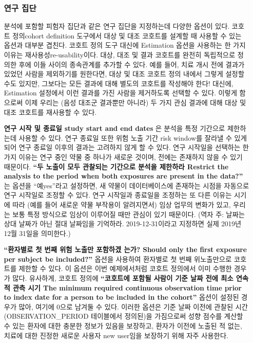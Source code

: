 \documentclass[10.5pt]{book}
\theoremstyle{definition}
\theoremstyle{definition}
\theoremstyle{definition}
\theoremstyle{remark}
\begin{document}
\subsubsection*{연구 집단}\label{-}

분석에 포함할 피험자 집단과 같은 연구 집단을 지정하는데 다양한 옵션이
있다. 코호트 정의cohort definition 도구에서 대상 및 대조 코호트를 설계할
때 사용할 수 있는 옵션과 대부분 겹친다. 코호트 정의 도구 대신에
Estimation 옵션을 사용하는 한 가지 이유는 재사용성re-usability이다.
대상, 대조 및 결과 코호트를 완전히 독립적으로 정의한 후에 이들 사이의
종속관계를 추가할 수 있다. 예를 들어, 치료 개시 전에 결과가 있었던
사람을 제외하기를 원한다면, 대상 및 대조 코호트 정의 내에서 그렇게
설정할 수도 있지만, 그보다는 모든 결과에 대해 별도의 코호트를 작성해야
한다! 대신에, Estimation 설정에서 이런 결과를 가진 사람을 제거하도록
선택할 수 있다. 이렇게 함으로써 이제 우리는 (음성 대조군 결과뿐만
아니라) 두 가지 관심 결과에 대해 대상 및 대조 코호트를 재사용할 수 있다.

\textbf{연구 시작 및 종료일 study start and end dates} 은 분석을 특정
기간으로 제한하는데 사용할 수 있다. 연구 종료일 또한 위험 노출 기간 risk
window를 잘라낼 수 있게 되어 연구 종료일 이후의 결과는 고려하지 않게 할
수 있다. 연구 시작일을 선택하는 한 가지 이유는 연구 중인 약물 중 하나가
새로운 것이며, 전에는 존재하지 않을 수 있기 때문이다. \textbf{``두
노출이 모두 관찰되는 기간으로 분석을 제한하라 Restrict the analysis to
the period when both exposures are present in the data?''} 는 옵션을
``예yes''라고 설정하면, 새 약물이 데이터베이스에 존재하는 시점을
자동으로 연구 시작일로 조정할 수 있다. 연구 시작일과 종료일을 조정하는
또 다른 이유는 시기에 따라 (예를 들어 새로운 약물 부작용이 알려지면서)
임상 업무의 변화가 있고, 우리는 보통 특정 방식으로 임상이 이루어질 때만
관심이 있기 때문이다. (역자 주: 날짜는 상대 날짜가 아닌 절대 날짜임을
기억하라. 2019-12-31이라고 지정하면 실제 2019년 12월 31일을 의미한다.)

\textbf{``환자별로 첫 번째 위험 노출만 포함하겠 는가? Should only the
first exposure per subject be included?''} 옵션을 사용하여 환자별로 첫
번째 위노출만으로 코호트를 제한할 수 있다. 이 옵션은 이번 예제에서처럼
코호트 정의에서 이미 수행한 경우가 많다. 유사하게, 코호트 정의에
\textbf{``코호트에 포함될 사람이 기준 날짜 전에 최소 연속적 관측 시기
The minimum required continuous observation time prior to index date for
a person to be included in the cohort''} 옵션이 설정된 경우가 많아,
여기에 0으로 남겨둘 수 있다. 이러한 옵션은 기준 날짜 이전에 관찰된 시간
(OBSERVATION\_PERIOD 테이블에서 정의된)을 가짐으로써 성향 점수를 계산할
수 있는 환자에 대한 충분한 정보가 있음을 보장하고, 환자가 이전에 노출된
적 없는, 치료에 대한 진정한 새로운 사용자 new user임을 보장하기 위해
자주 사용한다.
\end{document}
